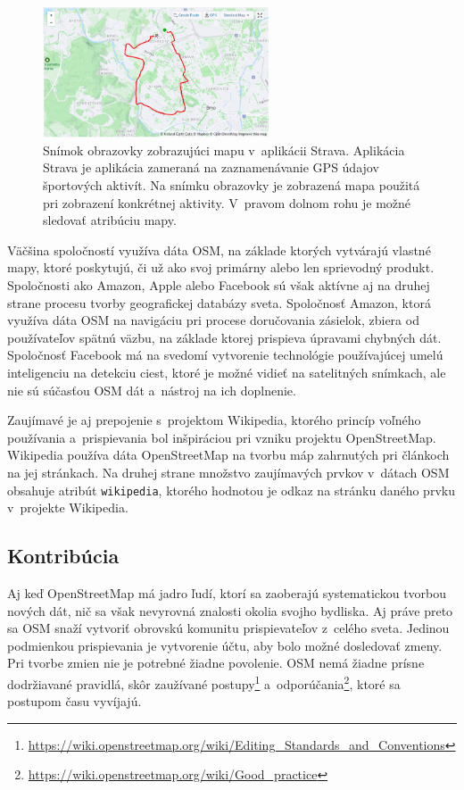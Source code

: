 \begin{figure}[hbt]
	\centering
	\includegraphics[width=0.6\textwidth]{obrazky-figures/img_strava.png}
	\caption{Snímok obrazovky zobrazujúci mapu v~aplikácii Strava. Aplikácia Strava je aplikácia zameraná na zaznamenávanie GPS údajov športových aktivít. Na snímku obrazovky je zobrazená mapa použitá pri zobrazení konkrétnej aktivity. V~pravom dolnom rohu je možné sledovať atribúciu mapy.}
	\label{img_strava}
\end{figure}

Väčšina spoločností využíva dáta OSM, na základe ktorých vytvárajú vlastné mapy, ktoré poskytujú, či už ako svoj primárny alebo len sprievodný produkt. Spoločnosti ako Amazon, Apple alebo Facebook sú však aktívne aj na druhej strane procesu tvorby geografickej databázy sveta. Spoločnosť Amazon, ktorá využíva dáta OSM na navigáciu pri procese doručovania zásielok, zbiera od používateľov spätnú väzbu, na základe ktorej prispieva úpravami chybných dát.\cite{osm_amazon} Spoločnosť Facebook má na svedomí vytvorenie technológie používajúcej umelú inteligenciu na detekciu ciest, ktoré je možné vidieť na satelitných snímkach, ale nie sú súčasťou OSM dát a~nástroj na ich doplnenie.\cite{osm_fb}

Zaujímavé je aj prepojenie s~projektom Wikipedia, ktorého princíp voľného používania a~prispievania bol inšpiráciou pri vzniku projektu OpenStreetMap. Wikipedia používa dáta OpenStreetMap na tvorbu máp zahrnutých pri článkoch na jej stránkach. Na druhej strane množstvo zaujímavých prvkov v~dátach OSM obsahuje atribút {\tt wikipedia}, ktorého hodnotou je odkaz na stránku daného prvku v~projekte Wikipedia. 

\subsection*{Kontribúcia}
Aj keď OpenStreetMap má jadro ľudí, ktorí sa zaoberajú systematickou tvorbou nových dát, nič sa však nevyrovná znalosti okolia svojho bydliska. Aj práve preto sa OSM snaží vytvoriť obrovskú komunitu prispievateľov z~celého sveta. Jedinou podmienkou prispievania je vytvorenie účtu, aby bolo možné dosledovať zmeny. Pri tvorbe zmien nie je potrebné žiadne povolenie. OSM nemá žiadne prísne dodržiavané pravidlá, skôr zaužívané postupy\footnote{\url{https://wiki.openstreetmap.org/wiki/Editing_Standards_and_Conventions}} a~odporúčania\footnote{\url{https://wiki.openstreetmap.org/wiki/Good_practice}}, ktoré sa postupom času vyvíjajú.


